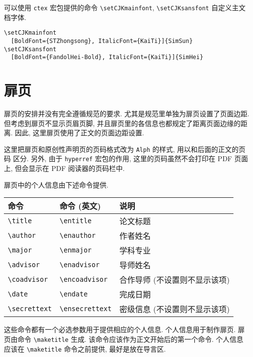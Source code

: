 可以使用 \verb|ctex| 宏包提供的命令 \verb|\setCJKmainfont|, \verb|\setCJKsansfont| 自定义主文档字体.
\begin{verbatim}
\setCJKmainfont
  [BoldFont={STZhongsong}, ItalicFont={KaiTi}]{SimSun}
\setCJKsansfont
  [BoldFont={FandolHei-Bold}, ItalicFont={KaiTi}]{SimHei}
\end{verbatim}

\section{扉页}

扉页的安排并没有完全遵循规范的要求. 尤其是规范里单独为扉页设置了页面边距. 但考虑到扉页不显示页眉页脚, 并且扉页里的各信息也都规定了距离页面边缘的距离. 因此, 这里扉页使用了正文的页面边距设置.

这里把扉页和原创性声明页的页码格式改为 \verb|Alph| 的样式, 用以和后面的正文的页码
区分. 另外, 由于 \verb|hyperref| 宏包的作用, 这里的页码虽然不会打印在 PDF 页面上,
但会显示在 PDF 阅读器的页码栏中.

扉页中的个人信息由下述命令提供.

\begin{center}
  \begin{tabular}{lll}
    \toprule
    命令          & 命令 (英文)     & 说明\\
    \midrule
    \verb|\title|      & \verb|\entitle|      & 论文标题\\
    \verb|\author|     & \verb|\enauthor|     & 作者姓名\\
    \verb|\major|      & \verb|\enmajor|      & 学科专业\\
    \verb|\advisor|    & \verb|\enadvisor|    & 导师姓名\\
    \verb|\coadvisor|  & \verb|\encoadvisor|  & 合作导师 (不设置则不显示该项)\\
    \verb|\date|       & \verb|\endate|       & 完成日期\\
    \verb|\secrettext| & \verb|\ensecrettext| & 密级信息 (不设置则不显示该项)\\
    \bottomrule
  \end{tabular}
\end{center}

这些命令都有一个必选参数用于提供相应的个人信息. 个人信息用于制作扉页. 扉页由命令 \verb|\maketitle| 生成. 该命令应该作为正文开始后的第一个命令. 个人信息应该在 \verb|\maketitle| 命令之前提供, 最好是放在导言区.

